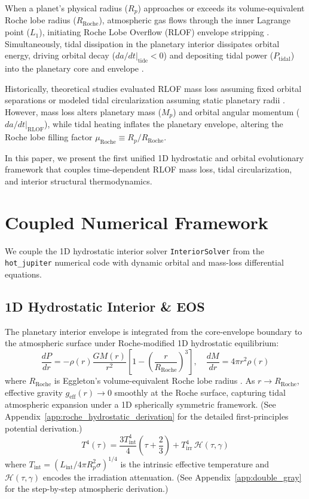 \documentclass[twocolumn,10pt]{article}
\providecommand{\citep}[1]{\cite{#1}}
\begin{document}
When a planet's physical radius ($R_p$) approaches or exceeds its volume-equivalent Roche lobe radius ($R_{\text{Roche}}$), atmospheric gas flows through the inner Lagrange point ($L_1$), initiating Roche Lobe Overflow (RLOF) envelope stripping \citep{Eggleton1983, Li2010}. Simultaneously, tidal dissipation in the planetary interior dissipates orbital energy, driving orbital decay ($\left.da/dt\right|_{\text{tide}} < 0$) and depositing tidal power ($P_{\text{tidal}}$) into the planetary core and envelope \citep{Hut1981, Leconte2010}.

Historically, theoretical studies evaluated RLOF mass loss assuming fixed orbital separations \citep{Jackson2017} or modeled tidal circularization assuming static planetary radii \citep{Eggleton1998}. However, mass loss alters planetary mass ($M_p$) and orbital angular momentum ($\left.da/dt\right|_{\text{RLOF}}$), while tidal heating inflates the planetary envelope, altering the Roche lobe filling factor $\mu_{\text{Roche}} \equiv R_p / R_{\text{Roche}}$. 

In this paper, we present the first unified 1D hydrostatic and orbital evolutionary framework that couples time-dependent RLOF mass loss, tidal circularization, and interior structural thermodynamics.

\section{Coupled Numerical Framework}
We couple the 1D hydrostatic interior solver \texttt{InteriorSolver} from the \texttt{hot\_jupiter} numerical code with dynamic orbital and mass-loss differential equations.

\subsection{1D Hydrostatic Interior \& EOS}
The planetary interior envelope is integrated from the core-envelope boundary to the atmospheric surface under Roche-modified 1D hydrostatic equilibrium:
\begin{equation}
\frac{dP}{dr} = -\rho(r) \frac{G M(r)}{r^2} \left[ 1 - \left(\frac{r}{R_{\text{Roche}}}\right)^3 \right], \quad \frac{dM}{dr} = 4\pi r^2 \rho(r)
\label{eq:roche_hydrostatic_main}
\end{equation}
where $R_{\text{Roche}}$ is Eggleton's volume-equivalent Roche lobe radius \citep{Eggleton1983}. As $r \to R_{\text{Roche}}$, effective gravity $g_{\text{eff}}(r) \to 0$ smoothly at the Roche surface, capturing tidal atmospheric expansion under a 1D spherically symmetric framework. (See Appendix~\ref{app:roche_hydrostatic_derivation} for the detailed first-principles potential derivation.)
\begin{equation}
T^4(\tau) = \frac{3 T_{\text{int}}^4}{4} \left( \tau + \frac{2}{3} \right) + T_{\text{irr}}^4 \, \mathcal{H}(\tau, \gamma)
\label{eq:guillot_main}
\end{equation}
where $T_{\text{int}} = (L_{\text{int}} / 4\pi R_p^2 \sigma)^{1/4}$ is the intrinsic effective temperature and $\mathcal{H}(\tau, \gamma)$ encodes the irradiation attenuation. (See Appendix~\ref{app:double_gray} for the step-by-step atmospheric derivation.)
\end{document}
